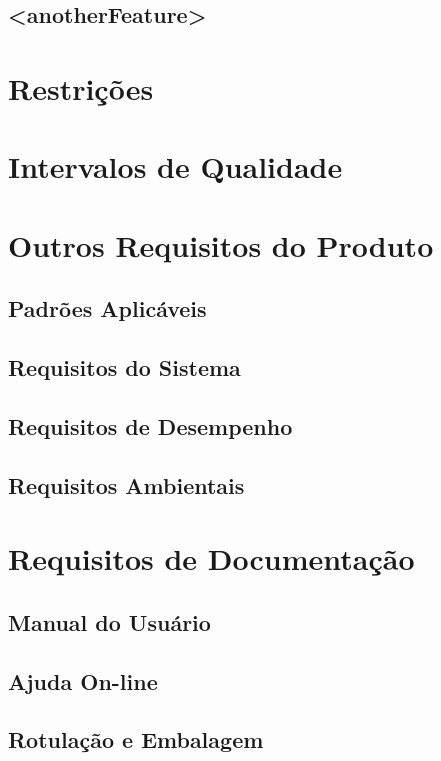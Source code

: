 \subsection{<anotherFeature>}


\section{Restrições}

\section{Intervalos de Qualidade}

\section{Outros Requisitos do Produto}

\subsection{Padrões Aplicáveis}

\subsection{Requisitos do Sistema}

\subsection{Requisitos de Desempenho }

\subsection{Requisitos Ambientais}

\section{Requisitos de Documentação}

\subsection{Manual do Usuário}

\subsection{Ajuda On-line}

\subsection{Rotulação e Embalagem}

